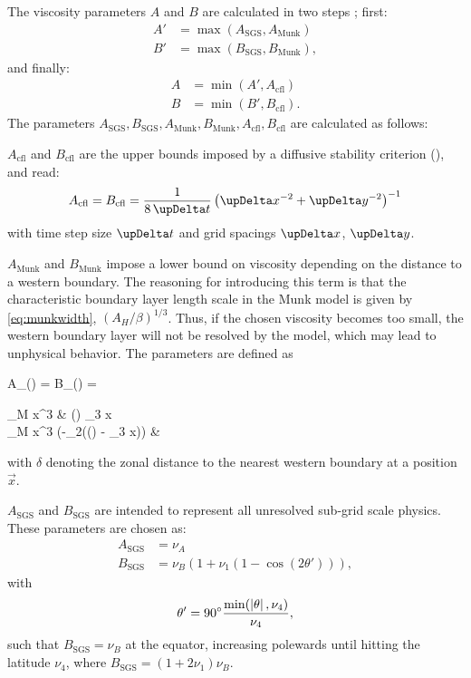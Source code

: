 The viscosity parameters \(A\) and \(B\) are calculated in two steps \citep{jochum}; first:
%
\begin{align}
	A' &= \max(A_\text{SGS},A_\text{Munk}) \\
	B' &= \max(B_\text{SGS},B_\text{Munk}),
\end{align}
%
and finally:
%
\begin{align}
	A &= \min(A',A_\text{cfl}) \\
	B &= \min(B',B_\text{cfl}).
\end{align}
%
The parameters \(A_\text{SGS}, B_\text{SGS}, A_\text{Munk}, B_\text{Munk}, A_\text{cfl}, B_\text{cfl}\) are calculated as follows:
%
\begin{items}
	\item \(A_\text{cfl}\) and \(B_\text{cfl}\) are the upper bounds imposed by a diffusive stability criterion (\cf {}), and read:
	\begin{equation}
	A_\text{cfl} = B_\text{cfl} = \frac{1}{8 \updel t} \left(\updel x^{-2} + \updel y^{-2}\right)^{-1}
	\end{equation}
	with time step size \(\updel t\) and grid spacings \(\updel x\), \(\updel y\).
	\item \(A_\text{Munk}\) and \(B_\text{Munk}\) impose a lower bound on viscosity depending on the distance to a western boundary. The reasoning for introducing this term is that the characteristic boundary layer length scale in the Munk model is given by \eqref{eq:munkwidth}, \ie \((A_H/\beta)^{1/3}\). Thus, if the chosen viscosity becomes too small, the western boundary layer will not be resolved by the model, which may lead to unphysical behavior. The parameters are defined as
	\begin{flalign}
		\hspace*{-6ex} A_() = B_() = 
			\begin{cases}
				\nu_M \beta \updel x^3 &  \delta() \leq \nu_3 \updel x \\
				\nu_M \beta \updel x^3 \exp\left(-\nu_2(\delta() - \nu_3 \updel x)\right) & 
			\end{cases}
	\end{flalign}
	with \(\delta\) denoting the zonal distance to the nearest western boundary at a position \(\vec{x}\).
	\item \(A_\text{SGS}\) and \(B_\text{SGS}\) are intended to represent all unresolved sub-grid scale physics. These parameters are chosen as:
	\begin{align}
	A_\text{SGS} &= \nu_A \\
	B_\text{SGS} &= \nu_B \left( 1 + \nu_1 (1 - \cos(2\theta')) \right),
	\end{align}
	with
	\begin{equation}
	\theta' = \ang{90} \frac{\min(\left| \theta \right|,\nu_4)}{\nu_4},
	\end{equation}
	such that \(B_\text{SGS} = \nu_B\) at the equator, increasing polewards until hitting the latitude \(\nu_4\), where \(B_\text{SGS} = (1 + 2\nu_1) \nu_B\).
\end{items}
